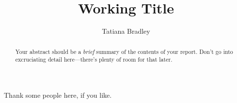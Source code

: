 \documentclass{scrippsthesis}
\title{Working Title}
\author{Tatiana Bradley}
\begin{document}
\test
\frontmatter
\maketitle



\begin{abstract}
  Your abstract should be a \emph{brief} summary of the contents of
  your report.  Don't go into excruciating detail here---there's
  plenty of room for that later.
\end{abstract}

\tableofcontents


\begin{acknowledgments}
 Thank some people here, if you like.
\end{acknowledgments}


\mainmatter




\backmatter

{}

\end{document}
